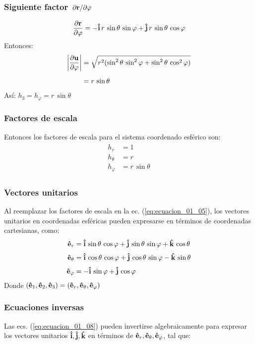 \documentclass[12pt]{beamer}
\begin{document}
\begin{frame}
\frametitle{Siguiente factor $\pdv*{\vb{r}}{\varphi}$}
\begin{align*}
\pdv{\vb{r}}{\varphi} = - \vu{i} \, r \, \sin \theta \, \sin \varphi + \vu{j} \, r \, \sin \theta \, \cos \varphi
\end{align*}
\pause
Entonces:
\begin{align*}
\abs{\pdv{\vb{u}}{\varphi}} &= \sqrt{r^{2} (\sin^{2} \theta \, \sin^{2} \varphi + \sin^{2} \theta \, \cos^{2} \varphi)} \\[0.5em]
&= r \, \sin \theta
\end{align*}
\pause
Así: $h_{3} = h_{\varphi} = r \, \sin \theta$
\end{frame}
\begin{frame}
\frametitle{Factores de escala}
Entonces los factores de escala para el sistema coordenado esférico son:
\pause
\begin{align}
\begin{aligned}
h_{r} &= 1 \\[0.5em]
h_{\theta} &= r \\[0.5em]
h_{\varphi} &= r \, \sin \theta
\end{aligned}
\label{eq:ecuacion_01_07}
\end{align}
\end{frame}
\begin{frame}
\frametitle{Vectores unitarios}
Al reemplazar los factores de escala en la ec. (\ref{eq:ecuacion_01_05}), los vectores unitarios en coordenadas esféricas pueden expresarse en términos de coordenadas cartesianas, como:
\pause
\begin{align}
\begin{aligned}
\vu{e}_{r} &= \vu{i} \, \sin \theta \, \cos \varphi + \vu{j} \, \sin \theta \, \sin \varphi + \vu{k} \, \cos \theta \\[0.25em]
\vu{e}_{\theta} &= \vu{i} \, \cos \theta \, \cos \varphi + \vu{j} \, \cos \theta \, \sin \varphi - \vu{k} \, \sin \theta \\[0.25em]
\vu{e}_{\varphi} &= - \vu{i} \, \sin \varphi + \vu{j} \, \cos \varphi
\end{aligned}
\label{eq:ecuacion_01_08}
\end{align}
Donde $(\vu{e}_{1}, \vu{e}_{2}, \vu{e}_{3}) = (\vu{e}_{r}, \vu{e}_{\theta}, \vu{e}_{\varphi})$
\end{frame}
\begin{frame}
\frametitle{Ecuaciones inversas}
Las ecs. (\ref{eq:ecuacion_01_08}) pueden invertirse algebraicamente para expresar los vectores unitarios $\vu{i}, \vu{j}, \vu{k}$ en términos de $\vu{e}_{r}, \vu{e}_{\theta}, \vu{e}_{\varphi}$, tal que:
\end{frame}
\end{document}

